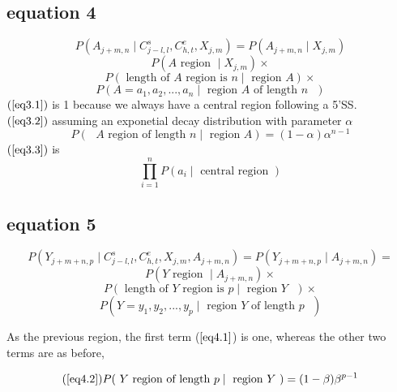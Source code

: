 \subsection{equation 4}
$$
P(A_{j+m,n} \; |\; C^s_{j-l,l},C^e_{h,t},X_{j,m}) = P(A_{j+m,n} \; |\; X_{j,m})
$$
\begin{equation}\label{eq3.1}
P(A \mbox{ region } \; |\; X_{j,m})\times
\end{equation}
\begin{equation}\label{eq3.2}
P( \mbox{ length of $A$ region is }n \; |\; \mbox{ region $A$} ) \times
\end{equation}
\begin{equation}\label{eq3.3}
P( A = a_1,a_2,...,a_n \; |\; \mbox{ region $A$ of length $n$ } )
\end{equation}
$(\ref{eq3.1})$ is 1 because we always have a central region following a 5'SS.\\
$(\ref{eq3.2})$
assuming an exponetial decay distribution with parameter $\alpha$
\begin{equation}\label{central_length}
P( \mbox{ $A$ region  of length }n\; | \; \mbox{ region $A$} ) = (1- \alpha) \alpha^{n-1}
\end{equation}
$(\ref{eq3.3})$ is
\begin{equation}\label{central_emission}
\prod_{i=1}^n P(a_i \; |\; \mbox{ central region })
\end{equation}


\subsection{equation 5}
$$
P(Y_{j+m+n,p}\; |\; C^s_{j-l,l},C^e_{h,t},X_{j,m},A_{j+m,n}) =
 P(Y_{j+m+n,p}\; |\; A_{j+m,n}) = 
$$
\begin{equation}\label{eq4.1}
P(Y \mbox{ region } \; |\; A_{j+m,n})\times
\end{equation}
\begin{equation}\label{eq4.2}
P( \mbox{ length of $Y$ region is }p\; | \; \mbox{ region $Y$ }) \times
\end{equation}
\begin{equation}\label{eq4.3}
P( Y = y_1,y_2,...,y_p \; |\; \mbox{ region $Y$ of length $p$ } )
\end{equation} 

As the previous region, the first term ($\ref{eq4.1}$) is one, whereas
the other two terms are as before,


\begin{equation}\label{py_length}
(\ref{eq4.2}) 
P( \mbox{ $Y$ region  of length }p \; | \; \mbox{ region $Y$ }) = (1- \beta) \beta^{p-1}
\end{equation}

